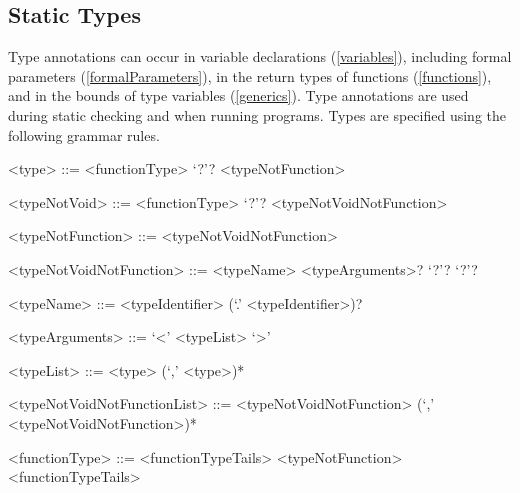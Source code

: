 \documentclass[makeidx]{article}
\begin{document}
{\subsection{Static Types}

\LMHash{}%
Type annotations can occur in variable declarations (\ref{variables}),
including formal parameters (\ref{formalParameters}),
in the return types of functions (\ref{functions}),
and in the bounds of type variables (\ref{generics}).
Type annotations are used during static checking and when running programs.
Types are specified using the following grammar rules.



\begin{grammar}

<type> ::= <functionType> `?'?
  \alt <typeNotFunction>

<typeNotVoid> ::= <functionType> `?'?
  \alt <typeNotVoidNotFunction>

<typeNotFunction> ::= \VOID{}
  \alt <typeNotVoidNotFunction>

<typeNotVoidNotFunction> ::= <typeName> <typeArguments>? `?'?
  \alt \FUNCTION{} `?'?

<typeName> ::= <typeIdentifier> (`.' <typeIdentifier>)?

<typeArguments> ::= `<' <typeList> `>'

<typeList> ::= <type> (`,' <type>)*

<typeNotVoidNotFunctionList> ::= \gnewline{}
  <typeNotVoidNotFunction> (`,' <typeNotVoidNotFunction>)*

<functionType> ::= <functionTypeTails>
  \alt <typeNotFunction> <functionTypeTails>


\end{grammar}}
\end{document}
